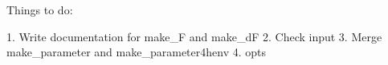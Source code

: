 Things to do:

1. Write documentation for make_F and make_dF
2. Check input
3. Merge make_parameter and make_parameter4henv
4. opts
